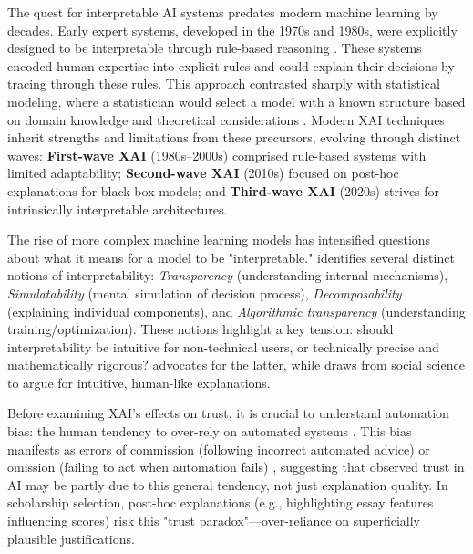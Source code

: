 The quest for interpretable AI systems predates modern machine learning by decades. Early expert systems, developed in the 1970s and 1980s, were explicitly designed to be interpretable through rule-based reasoning \cite{shortliffe_mycin_1976}. These systems encoded human expertise into explicit rules and could explain their decisions by tracing through these rules. This approach contrasted sharply with statistical modeling, where a statistician would select a model with a known structure based on domain knowledge and theoretical considerations \cite{breiman_statistical_2001}. Modern XAI techniques inherit strengths and limitations from these precursors, evolving through distinct waves: \textbf{First-wave XAI} (1980s–2000s) comprised rule-based systems with limited adaptability; \textbf{Second-wave XAI} (2010s) focused on post-hoc explanations for black-box models; and \textbf{Third-wave XAI} (2020s) strives for intrinsically interpretable architectures.

The rise of more complex machine learning models has intensified questions about what it means for a model to be "interpretable." \textcite{lipton_mythos_2018} identifies several distinct notions of interpretability: \emph{Transparency} (understanding internal mechanisms), \emph{Simulatability} (mental simulation of decision process), \emph{Decomposability} (explaining individual components), and \emph{Algorithmic transparency} (understanding training/optimization). These notions highlight a key tension: should interpretability be intuitive for non-technical users, or technically precise and mathematically rigorous? \textcite{rudin_stop_2019} advocates for the latter, while \textcite{miller_explanation_2017} draws from social science to argue for intuitive, human-like explanations.

Before examining XAI's effects on trust, it is crucial to understand automation bias: the human tendency to over-rely on automated systems \cite{mosier_automation_1996, parasuraman_automation_2000, skitka_automation_1999}. This bias manifests as errors of commission (following incorrect automated advice) or omission (failing to act when automation fails) \cite{mosier_automation_1996}, suggesting that observed trust in AI may be partly due to this general tendency, not just explanation quality. In scholarship selection, post-hoc explanations (e.g., highlighting essay features influencing scores) risk this "trust paradox"—over-reliance on superficially plausible justifications.

